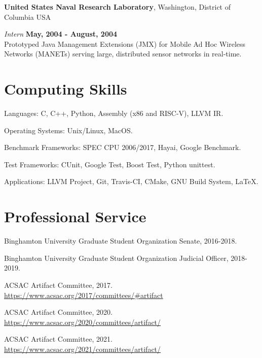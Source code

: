 \documentclass[margin,line]{res}
\begin{document}
\begin{resume}
{\bf United States Naval Research Laboratory}, Washington, District of Columbia USA

\vspace{-.3cm}
{\em Intern} \hfill {\bf May, 2004 - August, 2004}\\
Prototyped Java Management Extensions (JMX) for Mobile Ad Hoc Wireless Networks (MANETs) serving large, distributed sensor networks in real-time.

\section{\sc Computing Skills}
\begin{list2}
\item Languages: C, C++, Python, Assembly (x86 and RISC-V), LLVM IR.
\item Operating Systems: Unix/Linux, MacOS.
\item Benchmark Frameworks: SPEC CPU 2006/2017, Hayai, Google Benchmark.
\item Test Frameworks: CUnit, Google Test, Boost Test, Python unittest.
\item Applications: LLVM Project, Git, Travis-CI, CMake, GNU Build System, \LaTeX.
\end{list2}

\section{\sc Professional Service}
\begin{list2}
\item Binghamton University Graduate Student Organization Senate, 2016-2018.
\item Binghamton University Graduate Student Organization Judicial Officer, 2018-2019.
\item ACSAC Artifact Committee, 2017. \url{https://www.acsac.org/2017/committees/#artifact}
\item ACSAC Artifact Committee, 2020. \url{https://www.acsac.org/2020/committees/artifact/}
\item ACSAC Artifact Committee, 2021. \url{https://www.acsac.org/2021/committees/artifact/}
\end{list2}

\end{resume}
\end{document}
